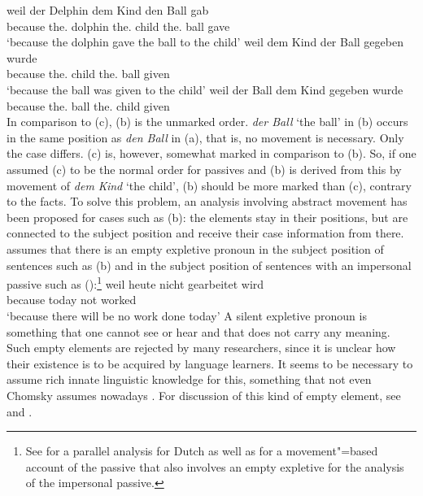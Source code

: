 \eal
\label{ex-passive-German-no-movement}
\ex 
\gll weil der Delphin dem Kind den Ball gab\\
     because the.\NOM{} dolphin the.\DAT{} child the.\ACC{} ball gave\\
\glt `because the dolphin gave the ball to the child'
\ex 
\gll weil    dem        Kind  der        Ball gegeben wurde\\
     because the.\DAT{} child the.\NOM{} ball given \AUX\\
\glt `because the ball was given to the child'
\ex 
\gll weil    der        Ball dem        Kind  gegeben wurde\\
     because the.\NOM{} ball the.\DAT{} child given     \AUX\\
\zl
In comparison to (c), (b) is the unmarked order. \emph{der Ball} `the ball' in (b) occurs
in the same position as \emph{den Ball} in (a), that is, no movement is necessary. Only the case differs.
(c) is, however, somewhat marked in comparison to (b). So, if one assumed (c) to
be the normal order for passives and (b) is derived from this by movement of \emph{dem
  Kind} `the child', (b) should be more marked than (c), contrary to the
facts. To solve this problem, an analysis involving abstract movement has been proposed for
cases such as (b): the elements stay in their positions, but are connected to
the subject position and receive their case information from there. \textcites[155--157]{Grewendorf88a}[]{Grewendorf93}
assumes that there is an empty expletive pronoun
in the subject position of sentences such as (b) and in the subject position of sentences with an
impersonal passive such as ():\footnote{%
	See  for a parallel analysis for Dutch as well as 
	 for a movement"=based account of the passive that also involves an
        empty expletive for the analysis of the impersonal passive.
}
\ea
\gll weil    heute nicht gearbeitet wird\\
     because today not   worked     \AUX\\
\glt `because there will be no work done today'
\z
A silent expletive pronoun is something that one cannot see or hear and that does not carry any
meaning. Such empty elements are rejected by many researchers, since it is unclear how their
existence is to be acquired by language learners. It seems to be necessary to assume rich innate
linguistic knowledge for this, something that not even Chomsky assumes nowadays \citep*{HCF2002a}. For discussion of 
this kind of empty element, see  and .

